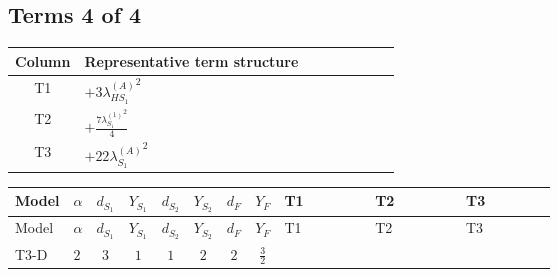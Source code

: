 \documentclass[8pt]{article}
\begin{document}
\begin{landscape}
\subsection*{Terms 4 of 4}
\begin{center}
\begin{tabular}{@{}c >{\raggedright\arraybackslash}p{0.82\linewidth}@{}}
\toprule
Column & Representative term structure \\
\midrule
T1 & \(\displaystyle +3 {\lambda_{HS_1}^{(A)}}^2\) \\
\midrule
T2 & \(\displaystyle +\frac{7 {\lambda_{S_1}^{(1)}}^2}{4}\) \\
\midrule
T3 & \(\displaystyle +22 {\lambda_{S_1}^{(A)}}^2\) \\
\midrule
\bottomrule
\end{tabular}
\end{center}
\smallskip
\tiny
\begin{longtable}{@{}llcccccc >{\raggedright\arraybackslash}p{0.21\linewidth} >{\raggedright\arraybackslash}p{0.21\linewidth} >{\raggedright\arraybackslash}p{0.21\linewidth}@{}}
\toprule
Model & $\alpha$ & $d_{S_1}$ & $Y_{S_1}$ & $d_{S_2}$ & $Y_{S_2}$ & $d_F$ & $Y_F$ & T1 & T2 & T3 \\
\midrule
\endfirsthead
\toprule
Model & $\alpha$ & $d_{S_1}$ & $Y_{S_1}$ & $d_{S_2}$ & $Y_{S_2}$ & $d_F$ & $Y_F$ & T1 & T2 & T3 \\
\midrule
\endhead
T3-D & $2$ & $3$ & $1$ & $1$ & $2$ & $2$ & $\frac{3}{2}$ & \scriptsize\adjustbox{max width=\linewidth}{$\begin{gathered} +3 {\lambda_{HS_1}^{(A)}}^2\end{gathered}$} & \scriptsize\adjustbox{max width=\linewidth}{$\begin{gathered} +\frac{7 {\lambda_{S_1}^{(1)}}^2}{4}\end{gathered}$} & \scriptsize\adjustbox{max width=\linewidth}{$\begin{gathered} +22 {\lambda_{S_1}^{(A)}}^2\end{gathered}$} \\
\midrule
\bottomrule
\end{longtable}
\end{landscape}
\end{document}
